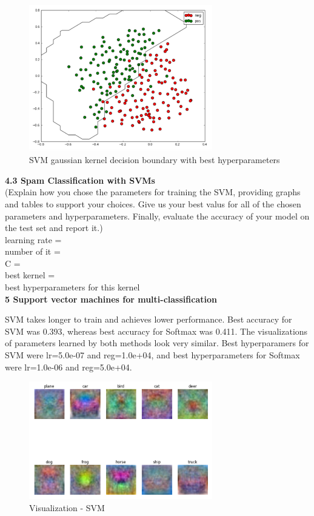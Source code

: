 \documentclass[12pt]{article}
\begin{document}
	\begin{figure}[!tpb]
		\centerline{\includegraphics[width=80mm]{SVM_gaussian.png}}
		\caption{\label{Fig3}
			SVM gaussian kernel decision boundary with best hyperparameters}
	\end{figure}
	
	\noindent \textbf{4.3 Spam Classification with SVMs}\\
	(Explain how you chose the parameters for training the SVM, providing graphs and tables to support your choices. Give us your best valus for all of the chosen parameters and hyperparameters. Finally, evaluate the accuracy of your model on the test set and report it.)\\
	learning rate =\\
	number of it = \\
	C = \\
	best kernel = \\
	best hyperparameters for this kernel \\
	
	\noindent \textbf{5 Support vector machines for multi-classification}
	
	SVM takes longer to train and achieves lower performance. Best accuracy for SVM was 0.393, whereas best accuracy for Softmax was 0.411. The visualizations of parameters learned by both methods look very similar. Best hyperparamers for SVM were lr=5.0e-07 and reg=1.0e+04, and best hyperparameters for Softmax were lr=1.0e-06 and reg=5.0e+04. 
	
	
	
	\begin{figure}[!tpb]
		\centerline{\includegraphics[width=80mm]{best_svm.png}}
		\caption{\label{Fig4}
			Visualization - SVM}
	\end{figure}
	
\end{document}
